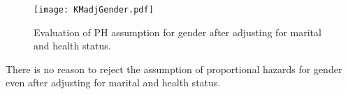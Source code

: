 \begin{enumerate}[(i)]
\begin{figure}[htbp]
	\centering
		\texttt{[image: KMadjGender.pdf]}
	\caption{Evaluation of PH assumption for gender after adjusting for marital and health status.}
	\label{figure6}
\end{figure}
There is 
no reason to reject the assumption of proportional hazards for gender even after adjusting for marital and health status. 
\end{enumerate}





















